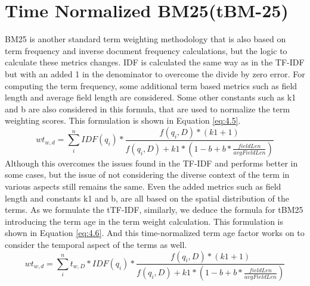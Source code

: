 \section{Time Normalized BM25(tBM-25)}
BM25 is another standard term weighting methodology that is also based on term frequency and inverse document frequency calculations, but the logic to calculate these metrics changes. IDF is calculated the same way as in the TF-IDF but with an added 1 in the denominator to overcome the divide by zero error. For computing the term frequency, some additional term based metrics such as field length and average field length are considered. Some other constants such as k1 and b are also considered in this formula, that are used to normalize the term weighting scores. This formulation is shown in Equation \ref{eq:4.5}.
\begin{equation}  \label{eq:4.5}
    wt_{w,d} = \sum_{i}^{n}IDF(q_{i}) * \frac{f(q_{i},D)*(k1+1)}{f(q_{i},D)+k1*(1-b+b*\frac{fieldLen}{avgFieldLen})}
\end{equation}
Although this overcomes the issues found in the TF-IDF and performs better in some cases, but the issue of not considering the diverse context of the term in various aspects still remains the same. Even the added metrics such as field length and constants k1 and b, are all based on the spatial distribution of the terms. As we formulate the tTF-IDF, similarly, we deduce the formula for tBM25 introducing the term age in the term weight calculation. This formulation is shown in Equation \ref{eq:4.6}. And this time-normalized term age factor works on to consider the temporal aspect of the terms as well.
\begin{equation}  \label{eq:4.6}
    wt_{w,d} = \sum_{i}^{n} t_{w,D}*IDF(q_{i}) * \frac{f(q_{i},D)*(k1+1)}{f(q_{i},D)+k1*(1-b+b*\frac{fieldLen}{avgFieldLen})}
\end{equation}
